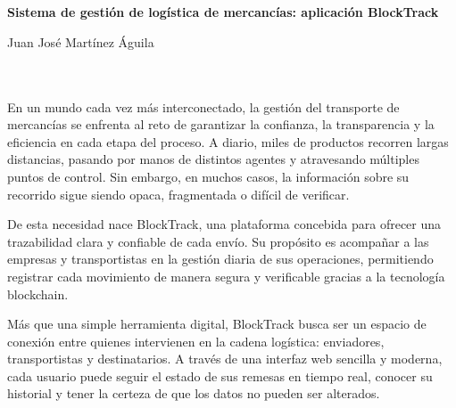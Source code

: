 \chapter*{}






\cleardoublepage
\thispagestyle{empty}

\begin{center}
{\large\bfseries Sistema de gestión de logística de mercancías: aplicación BlockTrack}\\
\end{center}
\begin{center}
Juan José Martínez Águila\\
\end{center}

\\

\vspace{0.7cm}
\\

En un mundo cada vez más interconectado, la gestión del transporte de mercancías se enfrenta al reto de 
garantizar la confianza, la transparencia y la eficiencia en cada etapa del proceso. 
A diario, miles de productos recorren largas distancias, pasando por manos de distintos agentes y 
atravesando múltiples puntos de control. Sin embargo, en muchos casos, 
la información sobre su recorrido sigue siendo opaca, fragmentada o difícil de verificar.\

De esta necesidad nace BlockTrack, una plataforma concebida para ofrecer una trazabilidad clara y confiable 
de cada envío. Su propósito es acompañar a las empresas y transportistas en la gestión diaria de sus operaciones, 
permitiendo registrar cada movimiento de manera segura y verificable gracias a la tecnología blockchain.\

Más que una simple herramienta digital, BlockTrack busca ser un espacio de conexión entre quienes intervienen
 en la cadena logística: enviadores, transportistas y destinatarios. A través de una interfaz web sencilla 
 y moderna, cada usuario puede seguir el estado de sus remesas en tiempo real, conocer su historial y 
 tener la certeza de que los datos no pueden ser alterados.\

